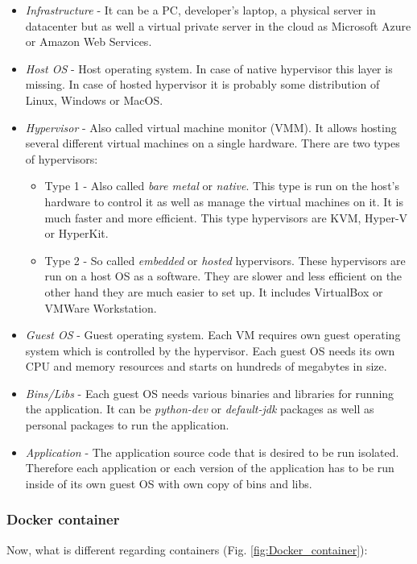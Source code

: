 \documentclass{gifce}
\begin{document}
\begin{itemize}
\item \textit{Infrastructure} - It can be a PC, developer's laptop, a
  physical server in datacenter but as well a virtual private server
  in the cloud as Microsoft Azure or Amazon Web Services.
\item \textit{Host OS} - Host operating system. In case of native
  hypervisor this layer is missing. In case of hosted hypervisor it is
  probably some distribution of Linux, Windows or MacOS.
\item \textit{Hypervisor} - Also called virtual machine monitor (VMM). It allows hosting several different virtual machines
on a single hardware. There are two types of hypervisors:

\begin{itemize}
\item Type 1 -  Also called \textit{bare metal} or \textit{native}. This type is run on the host's hardware to control it as well as manage 
the virtual machines on it. It is much faster and more efficient. This type hypervisors are KVM, Hyper-V or HyperKit.
\item Type 2 - So called \textit{embedded} or \textit{hosted} hypervisors. These hypervisors are run on a host OS as a software. They are slower
and less efficient on the other hand they are much easier to set up. It includes VirtualBox or VMWare Workstation.
\end{itemize}
\item \textit{Guest OS} - Guest operating system. Each VM requires own guest operating system which is controlled by the hypervisor. Each 
guest OS needs its own CPU and memory resources and starts on hundreds of megabytes in size.
\item \textit{Bins/Libs} - Each guest OS needs various binaries and libraries for running the application. It can be \textit{python-dev} or \textit{default-jdk} packages as well as personal packages to run the application.
\item \textit{Application} - The application source code that is desired to be run isolated. Therefore each application or each version of the application has to be run inside of its own guest OS with own copy of bins and libs. 
\end{itemize}



\subsubsection{Docker container}
\noindent
Now, what is different regarding containers (Fig. \ref{fig:Docker_container}):
\end{document}
